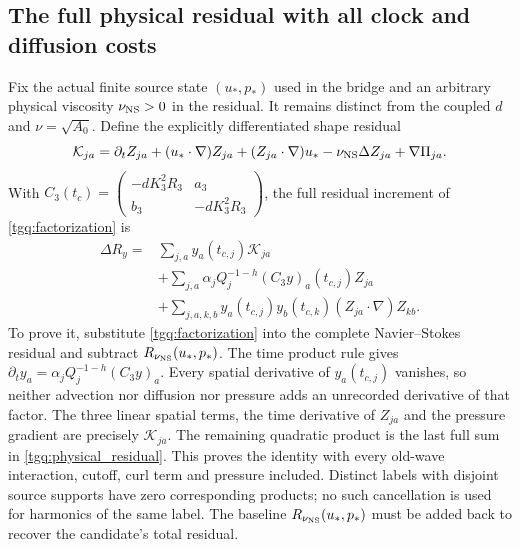 \subsection{The full physical residual with all clock and diffusion costs}
\label{tgq:full_residual}
Fix the actual finite source state $(u_*,p_*)$ used in the bridge and
an arbitrary physical viscosity $\nu_{\rm NS}>0$ in the residual.
It remains distinct from the coupled $d$ and $\nu=\sqrt{A_0}$.
Define the explicitly differentiated shape residual
\[
 \mathcal K_{ja}=
 \partial_tZ_{ja}+(u_*\cdot\nabla)Z_{ja}
 +(Z_{ja}\cdot\nabla)u_*-\nu_{\rm NS}\Delta Z_{ja}+\nabla\Pi_{ja}.
\]
With $C_3(t_c)=
\begin{pmatrix}-dK_3^2R_3&a_3\\ b_3&-dK_3^2R_3\end{pmatrix}$,
the full residual increment of \eqref{tgq:factorization} is
\begin{equation}
 \begin{split}
 \Delta R_y={}&
 \sum_{j,a} y_a(t_{c,j})\mathcal K_{ja}\\
 &+\sum_{j,a}\alpha_jQ_j^{-1-h}
                   (C_3y)_a(t_{c,j})Z_{ja}\\
 &+\sum_{j,a,k,b} y_a(t_{c,j})y_b(t_{c,k})
                                  (Z_{ja}\cdot\nabla)Z_{kb}.
 \end{split}\label{tgq:physical_residual}
\end{equation}
To prove it, substitute \eqref{tgq:factorization} into the complete
Navier--Stokes residual and subtract $R_{\nu_{\rm NS}}(u_*,p_*)$.
The time product rule gives
$\partial_ty_a=\alpha_jQ_j^{-1-h}(C_3y)_a$.
Every spatial derivative of $y_a(t_{c,j})$ vanishes, so neither
advection nor diffusion nor pressure adds an unrecorded derivative
of that factor. The three linear spatial terms, the time derivative
of $Z_{ja}$ and the pressure gradient are precisely $\mathcal K_{ja}$.
The remaining quadratic product is the last full sum in
\eqref{tgq:physical_residual}. This proves the identity with every
old-wave interaction, cutoff, curl term and pressure included.
Distinct labels with disjoint source supports have zero corresponding
products; no such cancellation is used for harmonics of the same label.
The baseline $R_{\nu_{\rm NS}}(u_*,p_*)$ must be added back to recover
the candidate's total residual.

